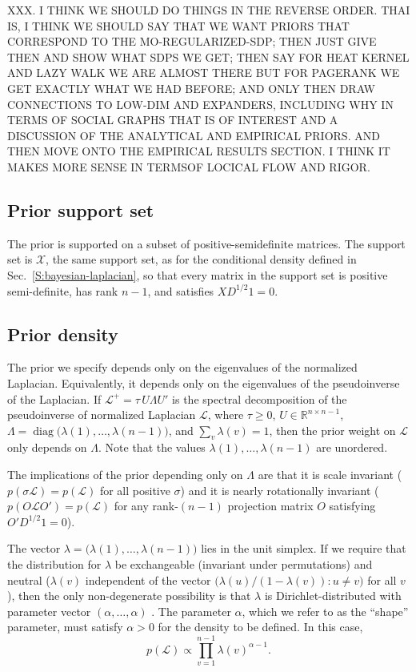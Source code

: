 \documentclass[12pt]{article}
\newcommand{\reals}{\mathbb{R}}
\DeclareMathOperator*{\diag}{diag}
\theoremstyle{plain}
\begin{document}
XXX.  I THINK WE SHOULD DO THINGS IN THE REVERSE ORDER.  THAI IS, I THINK WE SHOULD SAY THAT WE WANT PRIORS THAT CORRESPOND TO THE MO-REGULARIZED-SDP; THEN JUST GIVE THEN AND SHOW WHAT SDPS WE GET; THEN SAY FOR HEAT KERNEL AND LAZY WALK WE ARE ALMOST THERE BUT FOR PAGERANK WE GET EXACTLY WHAT WE HAD BEFORE; AND ONLY THEN DRAW CONNECTIONS TO LOW-DIM AND EXPANDERS, INCLUDING WHY IN TERMS OF SOCIAL GRAPHS THAT IS OF INTEREST AND A DISCUSSION OF THE ANALYTICAL AND EMPIRICAL PRIORS.  AND THEN MOVE ONTO THE EMPIRICAL RESULTS SECTION.  I THINK IT MAKES MORE SENSE IN TERMSOF LOCICAL FLOW AND RIGOR.

\subsection{Prior support set}
\label{S:prior-support}

The prior is supported on a subset of positive-semidefinite
matrices.  The support set is $\mathcal{X}$, the same support set, as
for the conditional density defined in
Sec.~\ref{S:bayesian-laplacian}, so that every matrix in the support
set is positive semi-definite, has rank $n - 1$, and satisfies
$X D^{1/2} 1 = 0$.


\subsection{Prior density}
\label{S:prior-density}

The prior we specify depends only on the eigenvalues of the normalized
Laplacian.  Equivalently, it depends only on the eigenvalues of the pseudoinverse of
the Laplacian.  If $\mathcal{L}^+ = \tau \, U \Lambda U'$ is the spectral
decomposition of the pseudoinverse of normalized Laplacian
$\mathcal{L}$, where $\tau \geq 0$,
$U \in \reals^{n \times n -1}$, 
$\Lambda = \diag\big(\lambda(1), \dotsc, \lambda({n-1})\big)$, and
$\sum_v \lambda(v) = 1$,  then the prior
weight on $\mathcal{L}$ only depends on $\Lambda$.  Note that the
values $\lambda(1), \dotsc, \lambda(n-1)$ are unordered.

The implications of the prior depending only on $\Lambda$ are that it
is scale invariant ($p(\sigma \mathcal{L}) = p(\mathcal{L})$ for all
positive $\sigma$) and it is nearly rotationally invariant
($p(O \mathcal{L} O') = p(\mathcal{L})$ for any rank-$(n-1)$
projection matrix $O$ satisfying $O' D^{1/2} 1 = 0$).

The vector $\lambda = \big(\lambda(1), \dotsc, \lambda(n-1)\big)$ lies
in the unit simplex.  If we require that the
distribution for $\lambda$ be exchangeable (invariant under
permutations) and neutral ($\lambda(v)$ independent of the vector
$\big(\lambda(u) / (1 - \lambda(v)) : u \neq v\big)$ for all $v$),
then the only non-degenerate possibility is that $\lambda$ is
Dirichlet-distributed with parameter vector $(\alpha, \ldots, \alpha)$
\cite{fabius1973two}.  The parameter $\alpha$, which we refer to as
the ``shape'' parameter, must satisfy $\alpha > 0$ for the density to
be defined.  In this case,
\begin{equation}\label{E:dirichlet-prior}
  p(\mathcal{L})
   \propto \prod_{v=1}^{n-1} \lambda(v)^{\alpha - 1}.
\end{equation}
\end{document}
